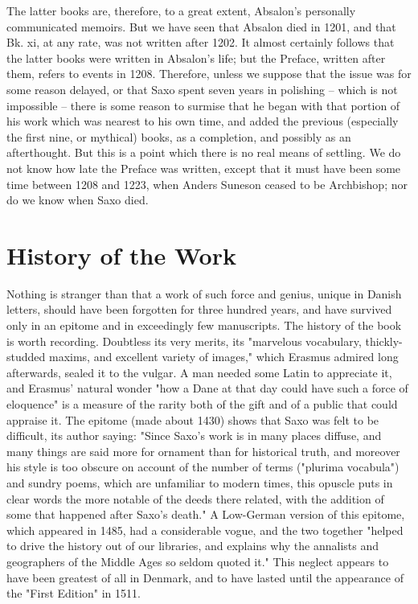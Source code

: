\documentclass[10pt,a4paper]{report}
\begin{document}
The latter books are, therefore, to a great extent, Absalon's personally communicated memoirs. But we have seen that Absalon died in 1201, and that Bk. xi, at any rate, was not written after 1202. It almost certainly follows that the latter books were written in Absalon's life; but the Preface, written after them, refers to events in 1208. Therefore, unless we suppose that the issue was for some reason delayed, or that Saxo spent seven years in polishing -- which is not impossible -- there is some reason to surmise that he began with that portion of his work which was nearest to his own time, and added the previous (especially the first nine, or mythical) books, as a completion, and possibly as an afterthought. But this is a point which there is no real means of settling. We do not know how late the Preface was written, except that it must have been some time between 1208 and 1223, when Anders Suneson ceased to be Archbishop; nor do we know when Saxo died.\\

\chapter{History of the Work}
Nothing is stranger than that a work of such force and genius, unique in Danish letters, should have been forgotten for three hundred years, and have survived only in an epitome and in exceedingly few manuscripts. The history of the book is worth recording. Doubtless its very merits, its "marvelous vocabulary, thickly-studded maxims, and excellent variety of images," which Erasmus admired long afterwards, sealed it to the vulgar. A man needed some Latin to appreciate it, and Erasmus' natural wonder "how a Dane at that day could have such a force of eloquence" is a measure of the rarity both of the gift and of a public that could appraise it. The epitome (made about 1430) shows that Saxo was felt to be difficult, its author saying: "Since Saxo's work is in many places diffuse, and many things are said more for ornament than for historical truth, and moreover his style is too obscure on account of the number of terms ("plurima vocabula") and sundry poems, which are unfamiliar to modern times, this opuscle puts in clear words the more notable of the deeds there related, with the addition of some that happened after Saxo's death." A Low-German version of this epitome, which appeared in 1485, had a considerable vogue, and the two together "helped to drive the history out of our libraries, and explains why the annalists and geographers of the Middle Ages so seldom quoted it." This neglect appears to have been greatest of all in Denmark, and to have lasted until the appearance of the "First Edition" in 1511.\\
\end{document}
